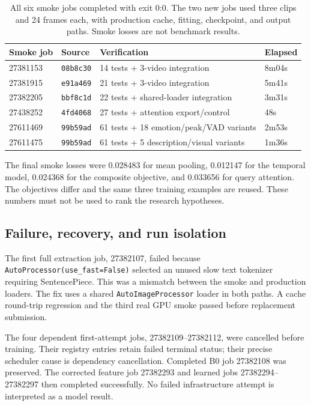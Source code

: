 \documentclass[11pt,a4paper]{article}
\newcommand{\code}[1]{\texttt{#1}}
\begin{document}
\begin{table}[!htbp]\centering\small
\begin{tabular}{llll}\toprule
Smoke job & Source & Verification & Elapsed \\\midrule
27381153 & \code{08b8c30} & 14 tests + 3-video integration & 8m04s \\
27381915 & \code{e91a469} & 21 tests + 3-video integration & 5m41s \\
27382205 & \code{bbf8c1d} & 22 tests + shared-loader integration & 3m31s \\
27438252 & \code{4fd4068} & 27 tests + attention export/control & 48s \\
27611469 & \code{99b59ad} & 61 tests + 18 emotion/peak/VAD variants & 2m53s \\
27611475 & \code{99b59ad} & 61 tests + 5 description/visual variants & 1m36s \\\bottomrule
\end{tabular}
\caption{All six smoke jobs completed with exit 0:0. The two new jobs used three clips and 24 frames each, with production cache, fitting, checkpoint, and output paths. Smoke losses are not benchmark results.}\label{tab:smoke}
\end{table}\FloatBarrier

The final smoke losses were 0.028483 for mean pooling, 0.012147 for the temporal model, 0.024368 for the composite objective, and 0.033656 for query attention. The objectives differ and the same three training examples are reused. These numbers must not be used to rank the research hypotheses.

\subsection{Failure, recovery, and run isolation}
The first full extraction job, 27382107, failed because \code{AutoProcessor(use\_fast=False)} selected an unused slow text tokenizer requiring SentencePiece. This was a mismatch between the smoke and production loaders. The fix uses a shared \code{AutoImageProcessor} loader in both paths. A cache round-trip regression and the third real GPU smoke passed before replacement submission.

The four dependent first-attempt jobs, 27382109--27382112, were cancelled before training. Their registry entries retain failed terminal status; their precise scheduler cause is dependency cancellation. Completed B0 job 27382108 was preserved. The corrected feature job 27382293 and learned jobs 27382294--27382297 then completed successfully. No failed infrastructure attempt is interpreted as a model result.
\end{document}
